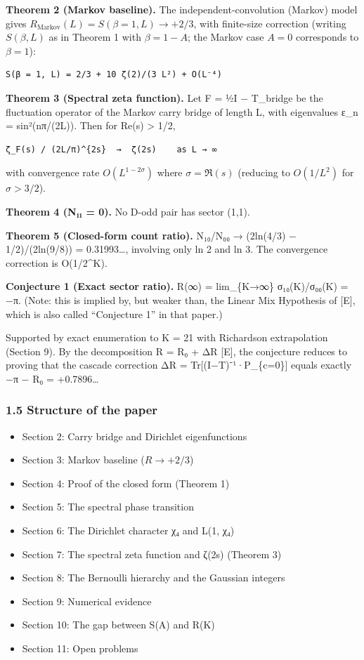 \documentclass[
  11pt,
]{article}
\providecommand{\tightlist}{%
  \setlength{\itemsep}{0pt}\setlength{\parskip}{0pt}}
\begin{document}
\textbf{Theorem 2 (Markov baseline).} The independent-convolution (Markov) model
gives \(R_{\mathrm{Markov}}(L) = S(\beta = 1, L) \to +2/3\), with finite-size
correction (writing \(S(\beta, L)\) as in Theorem 1 with \(\beta = 1 - A\); the
Markov case \(A = 0\) corresponds to \(\beta = 1\)):

\begin{verbatim}
S(β = 1, L) = 2/3 + 10 ζ(2)/(3 L²) + O(L⁻⁴)
\end{verbatim}

\textbf{Theorem 3 (Spectral zeta function).} Let F = ½I − T\_bridge be the
fluctuation operator of the Markov carry bridge of length L, with eigenvalues
ε\_n = sin²(nπ/(2L)). Then for Re(s) \textgreater{} 1/2,

\begin{verbatim}
ζ_F(s) / (2L/π)^{2s}  →  ζ(2s)    as L → ∞
\end{verbatim}

with convergence rate \(O(L^{1-2\sigma})\) where \(\sigma = \Re(s)\) (reducing
to \(O(1/L^2)\) for \(\sigma > 3/2\)).

\textbf{Theorem 4 (N₁₁ = 0).} No D-odd pair has sector (1,1).

\textbf{Theorem 5 (Closed-form count ratio).} N₁₀/N₀₀ → (2ln(4/3) −
1/2)/(2ln(9/8)) = 0.31993\ldots, involving only ln 2 and ln 3. The convergence
correction is O(1/2\^{}K).

\textbf{Conjecture 1 (Exact sector ratio).} R(∞) = lim\_\{K→∞\} σ₁₀(K)/σ₀₀(K) =
−π. (Note: this is implied by, but weaker than, the Linear Mix Hypothesis of
{[}E{]}, which is also called ``Conjecture 1'' in that paper.)

Supported by exact enumeration to K = 21 with Richardson extrapolation (Section
9). By the decomposition R = R₀ + ΔR {[}E{]}, the conjecture reduces to proving
that the cascade correction ΔR = Tr{[}(I−T)⁻¹·P\_\{c=0\}{]} equals exactly −π −
R₀ = +0.7896\ldots{}

\subsubsection{1.5 Structure of the paper}\label{structure-of-the-paper}

\begin{itemize}
\tightlist
\item
  Section 2: Carry bridge and Dirichlet eigenfunctions
\item
  Section 3: Markov baseline (\(R \to +2/3\))
\item
  Section 4: Proof of the closed form (Theorem 1)
\item
  Section 5: The spectral phase transition
\item
  Section 6: The Dirichlet character χ₄ and L(1, χ₄)
\item
  Section 7: The spectral zeta function and ζ(2s) (Theorem 3)
\item
  Section 8: The Bernoulli hierarchy and the Gaussian integers
\item
  Section 9: Numerical evidence
\item
  Section 10: The gap between S(A) and R(K)
\item
  Section 11: Open problems
\end{itemize}
\end{document}
